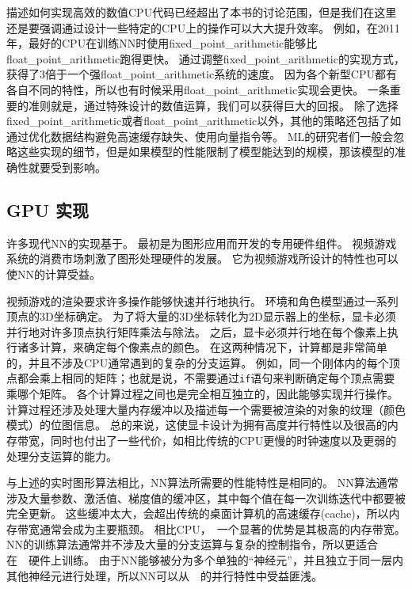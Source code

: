 描述如何实现高效的数值CPU代码已经超出了本书的讨论范围，但是我们在这里还是要强调通过设计一些特定的CPU上的操作可以大大提升效率。
例如，在2011年，最好的CPU在训练\gls{NN}时使用\gls{fixed_point_arithmetic}能够比\gls{float_point_arithmetic}跑得更快。
通过调整\gls{fixed_point_arithmetic}的实现方式，\citet{Vanhoucke-et-al-2011}获得了3倍于一个强\gls{float_point_arithmetic}系统的速度。
因为各个新型CPU都有各自不同的特性，所以也有时候采用\gls{float_point_arithmetic}实现会更快。
一条重要的准则就是，通过特殊设计的数值运算，我们可以获得巨大的回报。
除了选择\gls{fixed_point_arithmetic}或者\gls{float_point_arithmetic}以外，其他的策略还包括了如通过优化数据结构避免高速缓存缺失、使用向量指令等。
\gls{ML}的研究者们一般会忽略这些实现的细节，但是如果模型的性能限制了模型能达到的规模，那该模型的准确性就要受到影响。

\subsection{GPU 实现}
\label{sec:gpu_implementations}

许多现代\gls{NN}的实现基于。
最初是为图形应用而开发的专用硬件组件。
视频游戏系统的消费市场刺激了图形处理硬件的发展。
它为视频游戏所设计的特性也可以使\gls{NN}的计算受益。

视频游戏的渲染要求许多操作能够快速并行地执行。
环境和角色模型通过一系列顶点的3D坐标确定。
为了将大量的3D坐标转化为2D显示器上的坐标，显卡必须并行地对许多顶点执行矩阵乘法与除法。
之后，显卡必须并行地在每个像素上执行诸多计算，来确定每个像素点的颜色。
在这两种情况下，计算都是非常简单的，并且不涉及CPU通常遇到的复杂的分支运算。
例如，同一个刚体内的每个顶点都会乘上相同的矩阵；也就是说，不需要通过{\tt if}语句来判断确定每个顶点需要乘哪个矩阵。
各个计算过程之间也是完全相互独立的，因此能够实现并行操作。
计算过程还涉及处理大量内存缓冲以及描述每一个需要被渲染的对象的纹理（颜色模式）的位图信息。
总的来说，这使显卡设计为拥有高度并行特性以及很高的内存带宽，同时也付出了一些代价，如相比传统的CPU更慢的时钟速度以及更弱的处理分支运算的能力。


与上述的实时图形算法相比，\gls{NN}算法所需要的性能特性是相同的。
\gls{NN}算法通常涉及大量参数、激活值、梯度值的缓冲区，其中每个值在每一次训练迭代中都要被完全更新。
这些缓冲太大，会超出传统的桌面计算机的高速缓存(cache)，所以内存带宽通常会成为主要瓶颈。
相比CPU，~一个显著的优势是其极高的内存带宽。
\gls{NN}的训练算法通常并不涉及大量的分支运算与复杂的控制指令，所以更适合在~~硬件上训练。
由于\gls{NN}能够被分为多个单独的``神经元''，并且独立于同一层内其他神经元进行处理，所以\gls{NN}可以从~~的并行特性中受益匪浅。


